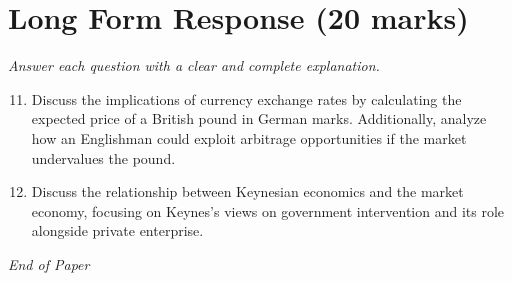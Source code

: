 \documentclass[12pt]{article}
\begin{document}
\section*{Long Form Response (20 marks)}
\textit{Answer each question with a clear and complete explanation.}
\begin{enumerate}[label=\arabic*.]
\setcounter{enumi}{10}
\item Discuss the implications of currency exchange rates by calculating the expected price of a British pound in German marks. Additionally, analyze how an Englishman could exploit arbitrage opportunities if the market undervalues the pound.
\item Discuss the relationship between Keynesian economics and the market economy, focusing on Keynes's views on government intervention and its role alongside private enterprise.
\end{enumerate}

\vfill
\noindent\textit{End of Paper}
\end{document}
